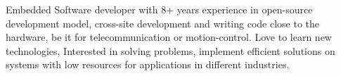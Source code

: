 

\begin{cvparagraph}

Embedded Software developer with 8+ years experience in open-source development model, cross-site development and writing code close to the hardware, be it for telecommunication or motion-control. Love to learn new technologies, Interested in solving problems, implement efficient solutions on systems with low resources for applications in different industries.
\end{cvparagraph}
